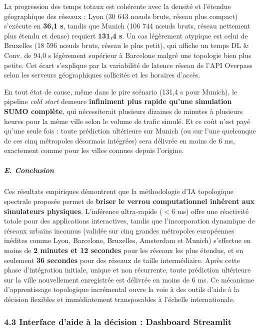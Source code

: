 \documentclass[10pt, a4paper]{article}
\begin{document}
La progression des temps totaux est cohérente avec la densité et
l'étendue géographique des réseaux : Lyon (30 643 nœuds bruts, réseau
plus compact) s'exécute en \textbf{36,1 s}, tandis que Munich (106 744
nœuds bruts, réseau nettement plus étendu et dense) requiert
\textbf{131,4 s}. Un cas légèrement atypique est celui de Bruxelles (18
596 nœuds bruts, réseau le plus petit), qui affiche un temps DL \& Conv.
de 94,0 s légèrement supérieur à Barcelone malgré une topologie bien
plus petite. Cet écart s'explique par la variabilité de latence réseau
de l'API Overpass selon les serveurs géographiques sollicités et les
horaires d'accès.

En tout état de cause, même dans le pire scénario (131,4 s pour Munich),
le pipeline \emph{cold start} demeure \textbf{infiniment plus rapide
qu'une simulation SUMO complète}, qui nécessiterait plusieurs dizaines
de minutes à plusieurs heures pour la même ville selon le volume de
trafic simulé. Et ce coût n'est payé qu'une seule fois : toute
prédiction ultérieure sur Munich (ou sur l'une quelconque de ces cinq
métropoles désormais intégrées) sera délivrée en moins de 6 ms,
exactement comme pour les villes connues depuis l'origine.

\subparagraph{E. Conclusion}\label{e.-conclusion}

Ces résultats empiriques démontrent que la méthodologie d'IA topologique
spectrale proposée permet de \textbf{briser le verrou computationnel
inhérent aux simulateurs physiques}. L'inférence ultra-rapide (\(<6\)
ms) offre une réactivité totale pour des applications interactives,
tandis que l'incorporation dynamique de réseaux urbains inconnus
(validée sur cinq grandes métropoles européennes inédites comme Lyon,
Barcelone, Bruxelles, Amsterdam et Munich) s'effectue en moins de
\textbf{2 minutes et 12 secondes} pour les réseaux les plus étendus, et
en seulement \textbf{36 secondes} pour des réseaux de taille
intermédiaire. Après cette phase d'intégration initiale, unique et non
récurrente, toute prédiction ultérieure sur la ville nouvellement
enregistrée est délivrée en moins de 6 ms. Ce mécanisme d'apprentissage
topologique incrémental ouvre la voie à des outils d'aide à la décision
flexibles et immédiatement transposables à l'échelle internationale.

\subsubsection{4.3 Interface d'aide à la décision : Dashboard
Streamlit}\label{interface-daide-uxe0-la-duxe9cision-dashboard-streamlit}
\end{document}
